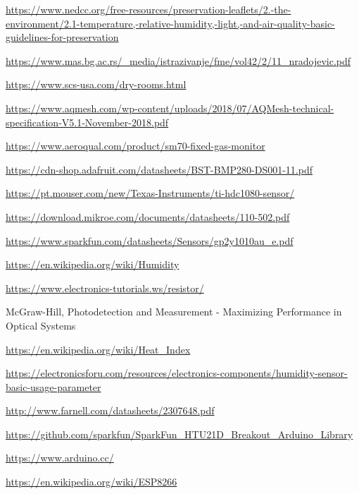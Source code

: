 \documentclass[12pt]{article}
\begin{document}
\newpage


\begin{thebibliography}{50}

\url{https://www.nedcc.org/free-resources/preservation-leaflets/2.-the-environment/2.1-temperature,-relative-humidity,-light,-and-air-quality-basic-guidelines-for-preservation}

\url{https://www.mas.bg.ac.rs/_media/istrazivanje/fme/vol42/2/11_nradojevic.pdf}

\url{https://www.scs-usa.com/dry-rooms.html}

\url{https://www.aqmesh.com/wp-content/uploads/2018/07/AQMesh-technical-specification-V5.1-November-2018.pdf}

\url{https://www.aeroqual.com/product/sm70-fixed-gas-monitor}

\url{https://cdn-shop.adafruit.com/datasheets/BST-BMP280-DS001-11.pdf}

\url{https://pt.mouser.com/new/Texas-Instruments/ti-hdc1080-sensor/}

\url{https://download.mikroe.com/documents/datasheets/110-502.pdf}

\url{https://www.sparkfun.com/datasheets/Sensors/gp2y1010au_e.pdf}

\url{https://en.wikipedia.org/wiki/Humidity}

\url{https://www.electronics-tutorials.ws/resistor/}

McGraw-Hill, Photodetection and Measurement - Maximizing Performance in Optical
Systems

\url{https://en.wikipedia.org/wiki/Heat_Index}

\url{https://electronicsforu.com/resources/electronics-components/humidity-sensor-basic-usage-parameter}

\url{http://www.farnell.com/datasheets/2307648.pdf}

\url{https://github.com/sparkfun/SparkFun_HTU21D_Breakout_Arduino_Library}

\url{https://www.arduino.cc/}

\url{https://en.wikipedia.org/wiki/ESP8266}


\end{thebibliography}
\end{document}

